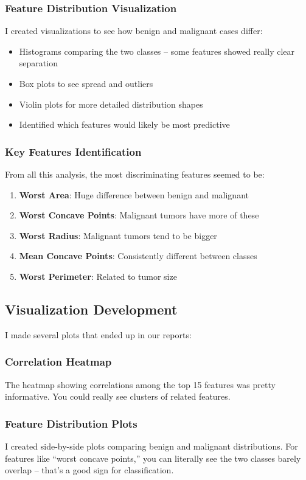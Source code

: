 \documentclass[12pt]{article}
\begin{document}
\subsubsection{Feature Distribution Visualization}
I created visualizations to see how benign and malignant cases differ:
\begin{itemize}
    \item Histograms comparing the two classes -- some features showed really clear separation
    \item Box plots to see spread and outliers
    \item Violin plots for more detailed distribution shapes
    \item Identified which features would likely be most predictive
\end{itemize}

\subsubsection{Key Features Identification}
From all this analysis, the most discriminating features seemed to be:
\begin{enumerate}
    \item \textbf{Worst Area}: Huge difference between benign and malignant
    \item \textbf{Worst Concave Points}: Malignant tumors have more of these
    \item \textbf{Worst Radius}: Malignant tumors tend to be bigger
    \item \textbf{Mean Concave Points}: Consistently different between classes
    \item \textbf{Worst Perimeter}: Related to tumor size
\end{enumerate}

\subsection{Visualization Development}

I made several plots that ended up in our reports:

\subsubsection{Correlation Heatmap}
The heatmap showing correlations among the top 15 features was pretty informative. You could really see clusters of related features.

\subsubsection{Feature Distribution Plots}
I created side-by-side plots comparing benign and malignant distributions. For features like ``worst concave points,'' you can literally see the two classes barely overlap -- that's a good sign for classification.
\end{document}
